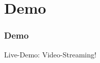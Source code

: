 \section{Demo}

\begin{frame}
  \frametitle{Demo}  
  \center
  Live-Demo: Video-Streaming!
\end{frame}